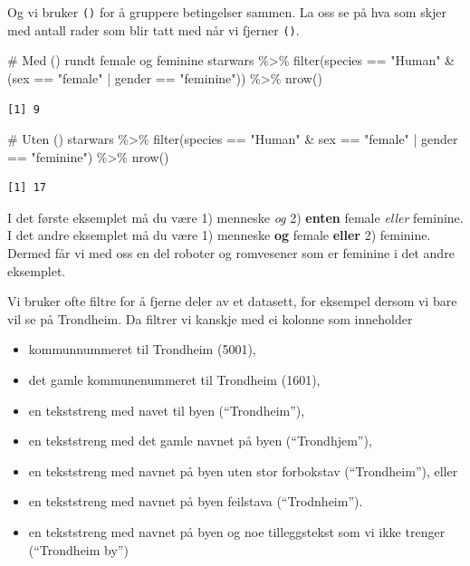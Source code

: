 \documentclass[
  letterpaper,
  DIV=11,
  numbers=noendperiod]{scrreprt}
\newenvironment{Shaded}{\begin{snugshade}}{\end{snugshade}}
\newcommand{\CommentTok}[1]{\textcolor[rgb]{0.37,0.37,0.37}{#1}}
\newcommand{\FunctionTok}[1]{\textcolor[rgb]{0.28,0.35,0.67}{#1}}
\newcommand{\NormalTok}[1]{\textcolor[rgb]{0.00,0.23,0.31}{#1}}
\newcommand{\SpecialCharTok}[1]{\textcolor[rgb]{0.37,0.37,0.37}{#1}}
\newcommand{\StringTok}[1]{\textcolor[rgb]{0.13,0.47,0.30}{#1}}
\providecommand{\tightlist}{%
  \setlength{\itemsep}{0pt}\setlength{\parskip}{0pt}}\usepackage{longtable,booktabs,array}
\begin{document}
Og vi bruker \texttt{()} for å gruppere betingelser sammen. La oss se på
hva som skjer med antall rader som blir tatt med når vi fjerner
\texttt{()}.

\begin{Shaded}
\begin{Highlighting}[]
\CommentTok{\# Med () rundt female og feminine}
\NormalTok{starwars }\SpecialCharTok{\%\textgreater{}\%} 
  \FunctionTok{filter}\NormalTok{(species }\SpecialCharTok{==} \StringTok{"Human"} \SpecialCharTok{\&}\NormalTok{ (sex }\SpecialCharTok{==} \StringTok{"female"} \SpecialCharTok{|}\NormalTok{ gender }\SpecialCharTok{==} \StringTok{"feminine"}\NormalTok{)) }\SpecialCharTok{\%\textgreater{}\%} 
  \FunctionTok{nrow}\NormalTok{()}
\end{Highlighting}
\end{Shaded}

\begin{verbatim}
[1] 9
\end{verbatim}

\begin{Shaded}
\begin{Highlighting}[]
\CommentTok{\# Uten ()}
\NormalTok{starwars }\SpecialCharTok{\%\textgreater{}\%} 
  \FunctionTok{filter}\NormalTok{(species }\SpecialCharTok{==} \StringTok{"Human"} \SpecialCharTok{\&}\NormalTok{ sex }\SpecialCharTok{==} \StringTok{"female"} \SpecialCharTok{|}\NormalTok{ gender }\SpecialCharTok{==} \StringTok{"feminine"}\NormalTok{) }\SpecialCharTok{\%\textgreater{}\%} 
  \FunctionTok{nrow}\NormalTok{()}
\end{Highlighting}
\end{Shaded}

\begin{verbatim}
[1] 17
\end{verbatim}

I det første eksemplet må du være 1) menneske \emph{og} 2)
\textbf{enten} female \emph{eller} feminine. I det andre eksemplet må du
være 1) menneske \textbf{og} female \textbf{eller} 2) feminine. Dermed
får vi med oss en del roboter og romvesener som er feminine i det andre
eksemplet.

Vi bruker ofte filtre for å fjerne deler av et datasett, for eksempel
dersom vi bare vil se på Trondheim. Da filtrer vi kanskje med ei kolonne
som inneholder

\begin{itemize}
\tightlist
\item
  kommunnummeret til Trondheim (5001),
\item
  det gamle kommunenummeret til Trondheim (1601),
\item
  en tekststreng med navet til byen (``Trondheim''),
\item
  en tekststreng med det gamle navnet på byen (``Trondhjem''),
\item
  en tekststreng med navnet på byen uten stor forbokstav
  (``Trondheim''), eller
\item
  en tekststreng med navnet på byen feilstava (``Trodnheim'').
\item
  en tekststreng med navnet på byen og noe tilleggstekst som vi ikke
  trenger (``Trondheim by'')
\end{itemize}
\end{document}
